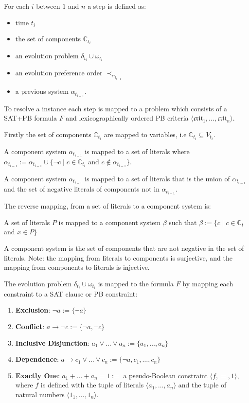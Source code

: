 For each $i$ between $1$ and $n$ a step is defined as:
\begin{itemize}
  \item time $t_i$
  \item the set of components $\mathbb{C}_{t_i}$ 
  \item an evolution problem $\delta_{t_i} \cup \omega_{t_i}$
  \item an evolution preference order $\prec_{\alpha_{t_{i-1}}}$
  \item a previous system $\alpha_{t_{i-1}}$.
\end{itemize}

To resolve a \modelname instance each step is mapped to a \modelimpl problem which consists of a SAT+PB formula $F$ 
and lexicographically ordered PB criteria $\langle \mathfrak{crit}_1,\ldots,\mathfrak{crit}_n \rangle$.

Firstly the set of components $\mathbb{C}_{t_i}$ are mapped to variables, i.e $\mathbb{C}_{t_i} \subseteq V_{t_i}$.

\begin{defs}
  \item A component system $\alpha_{t_{i-1}}$ is mapped to a set of literals where
   $\alpha_{t_{i-1}} := \alpha_{t_{i-1}} \cup \{\neg c \mid c \in \mathbb{C}_{t_i}$ and $ c \not \in \alpha_{t_{i-1}}\}$.
\end{defs}
A component system $\alpha_{t_{i-1}}$ is mapped to a set of literals that is the union of $\alpha_{t_{i-1}}$ and the set of negative literals of components not in $\alpha_{t_{i-1}}$.

The reverse mapping, from a set of literals to a component system is:
\begin{defs}
A set of literals $P$ is mapped to a component system $\beta$ such that $\beta := \{c \mid c \in \mathbb{C}_t$ and $x \in P\}$
\end{defs}
A component system is the set of components that are not negative in the set of literals.  
Note: the mapping from literals to components is surjective, and the mapping from components to literals is injective.


The evolution problem $\delta_{t_i} \cup \omega_{t_i}$ is mapped to the formula $F$
by mapping each constraint to a SAT clause or PB constraint:
\begin{enumerate}
  \item \textbf{Exclusion}: $\neg a := \{\neg a\}$
  \item \textbf{Conflict}: $a \rightarrow \neg c := \{\neg a, \neg c\}$ 
  \item \textbf{Inclusive Disjunction}: $a_1 \vee \ldots \vee a_n := \{a_1, \ldots,  a_n\}$ 
  \item \textbf{Dependence}: $a \rightarrow c_1 \vee \ldots \vee c_n := \{\neg a, c_1, \ldots, c_n\}$
  \item \textbf{Exactly One}: $a_1 + \ldots + a_n = 1 := $ a pseudo-Boolean constraint $\langle f,=, 1 \rangle$, 
  where $f$ is defined with the tuple of literals $\langle a_1 ,\ldots , a_n\rangle$ and the tuple of natural numbers $\langle 1_1,\ldots,1_n \rangle$.
\end{enumerate}


